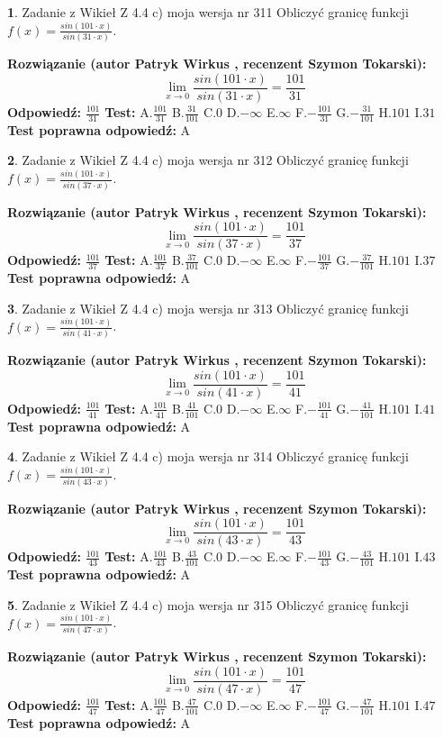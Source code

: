 \documentclass[12pt, a4paper]{article}
\theoremstyle{definition} %
\newtheorem{zad}{}
\newcommand{\zadStart}[1]{\begin{zad}#1\newline}
\newcommand{\zadStop}{\end{zad}}
\newcommand{\rozwStart}[2]{\noindent \textbf{Rozwiązanie (autor #1 , recenzent #2): }\newline}
\newcommand{\rozwStop}{\newline}
\newcommand{\odpStart}{\noindent \textbf{Odpowiedź:}\newline}
\newcommand{\odpStop}{\newline}
\newcommand{\testStart}{\noindent \textbf{Test:}\newline}
\newcommand{\testStop}{\newline}
\newcommand{\kluczStart}{\noindent \textbf{Test poprawna odpowiedź:}\newline}
\newcommand{\kluczStop}{\newline}
\begin{document}
\zadStart{Zadanie z Wikieł Z 4.4 c) moja wersja nr 311}
Obliczyć granicę funkcji $f(x)=\frac{sin(101\cdot x)}{sin(31\cdot x)}$.
\zadStop
\rozwStart{Patryk Wirkus}{Szymon Tokarski}
$$\lim\limits_{x\to 0}\frac{sin(101\cdot x)}{sin(31\cdot x)}=
\frac{101}{31}$$
\rozwStop
\odpStart
$\frac{101}{31}$
\odpStop
\testStart
A.$\frac{101}{31}$
B.$\frac{31}{101}$
C.$0$
D.$-\infty$
E.$\infty$
F.$-\frac{101}{31}$
G.$-\frac{31}{101}$
H.$101$
I.$31$
\testStop
\kluczStart
A
\kluczStop



\zadStart{Zadanie z Wikieł Z 4.4 c) moja wersja nr 312}
Obliczyć granicę funkcji $f(x)=\frac{sin(101\cdot x)}{sin(37\cdot x)}$.
\zadStop
\rozwStart{Patryk Wirkus}{Szymon Tokarski}
$$\lim\limits_{x\to 0}\frac{sin(101\cdot x)}{sin(37\cdot x)}=
\frac{101}{37}$$
\rozwStop
\odpStart
$\frac{101}{37}$
\odpStop
\testStart
A.$\frac{101}{37}$
B.$\frac{37}{101}$
C.$0$
D.$-\infty$
E.$\infty$
F.$-\frac{101}{37}$
G.$-\frac{37}{101}$
H.$101$
I.$37$
\testStop
\kluczStart
A
\kluczStop



\zadStart{Zadanie z Wikieł Z 4.4 c) moja wersja nr 313}
Obliczyć granicę funkcji $f(x)=\frac{sin(101\cdot x)}{sin(41\cdot x)}$.
\zadStop
\rozwStart{Patryk Wirkus}{Szymon Tokarski}
$$\lim\limits_{x\to 0}\frac{sin(101\cdot x)}{sin(41\cdot x)}=
\frac{101}{41}$$
\rozwStop
\odpStart
$\frac{101}{41}$
\odpStop
\testStart
A.$\frac{101}{41}$
B.$\frac{41}{101}$
C.$0$
D.$-\infty$
E.$\infty$
F.$-\frac{101}{41}$
G.$-\frac{41}{101}$
H.$101$
I.$41$
\testStop
\kluczStart
A
\kluczStop



\zadStart{Zadanie z Wikieł Z 4.4 c) moja wersja nr 314}
Obliczyć granicę funkcji $f(x)=\frac{sin(101\cdot x)}{sin(43\cdot x)}$.
\zadStop
\rozwStart{Patryk Wirkus}{Szymon Tokarski}
$$\lim\limits_{x\to 0}\frac{sin(101\cdot x)}{sin(43\cdot x)}=
\frac{101}{43}$$
\rozwStop
\odpStart
$\frac{101}{43}$
\odpStop
\testStart
A.$\frac{101}{43}$
B.$\frac{43}{101}$
C.$0$
D.$-\infty$
E.$\infty$
F.$-\frac{101}{43}$
G.$-\frac{43}{101}$
H.$101$
I.$43$
\testStop
\kluczStart
A
\kluczStop



\zadStart{Zadanie z Wikieł Z 4.4 c) moja wersja nr 315}
Obliczyć granicę funkcji $f(x)=\frac{sin(101\cdot x)}{sin(47\cdot x)}$.
\zadStop
\rozwStart{Patryk Wirkus}{Szymon Tokarski}
$$\lim\limits_{x\to 0}\frac{sin(101\cdot x)}{sin(47\cdot x)}=
\frac{101}{47}$$
\rozwStop
\odpStart
$\frac{101}{47}$
\odpStop
\testStart
A.$\frac{101}{47}$
B.$\frac{47}{101}$
C.$0$
D.$-\infty$
E.$\infty$
F.$-\frac{101}{47}$
G.$-\frac{47}{101}$
H.$101$
I.$47$
\testStop
\kluczStart
A
\kluczStop
\end{document}
